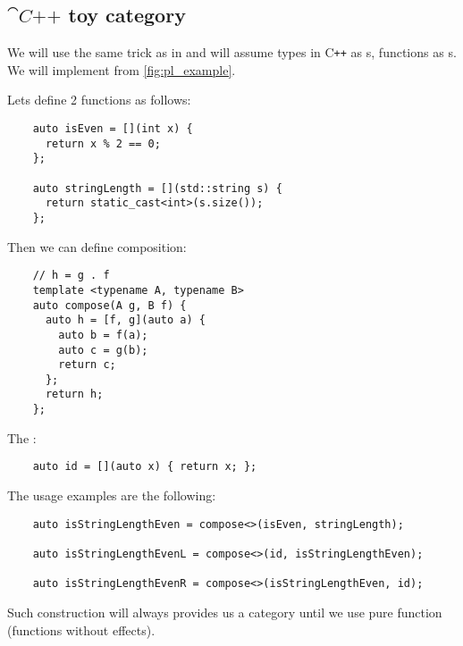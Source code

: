 \subsection{$\cat{C\texttt{++}}$ toy category}
\begin{example}
  \label{ex:cppcategory}
  We will use the same trick as in  and
  will assume 
  types in C\texttt{++} as s, 
  functions as s. We will implement
   from \cref{fig:pl_example}.


  Lets define 2 functions as follows:
  \begin{verbatim}
    auto isEven = [](int x) { 
      return x % 2 == 0; 
    };

    auto stringLength = [](std::string s) { 
      return static_cast<int>(s.size()); 
    };
  \end{verbatim}

  Then we can define composition:
  \begin{verbatim}
    // h = g . f
    template <typename A, typename B> 
    auto compose(A g, B f) {
      auto h = [f, g](auto a) {
        auto b = f(a);
        auto c = g(b);
        return c;
      };
      return h;
    };
  \end{verbatim}

  The :
  \begin{verbatim}
    auto id = [](auto x) { return x; };
  \end{verbatim}

  The usage examples are the following:
  \begin{verbatim}
    auto isStringLengthEven = compose<>(isEven, stringLength);

    auto isStringLengthEvenL = compose<>(id, isStringLengthEven);

    auto isStringLengthEvenR = compose<>(isStringLengthEven, id);  
  \end{verbatim}

  Such construction will always provides us a category until we
  use pure function (functions without effects).
\end{example}


